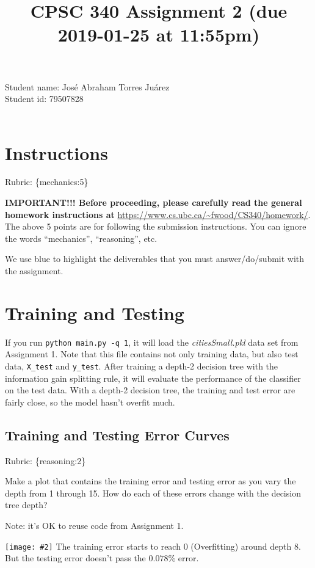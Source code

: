 \documentclass{article}
\def\rubric#1{\gre{Rubric: \{#1\}}}{}
\def\blu#1{{\color{blu}#1}}
\def\gre#1{{\color{gre}#1}}
\def\ans#1{{\color{ans}#1}}
\newcommand{\fig}[2]{\texttt{[image: \#2]}}
\begin{document}
\title{CPSC 340 Assignment 2 (due 2019-01-25 at 11:55pm)}
\author{}
\date{}
\maketitle
\vspace{-4em}
\ans{
    Student name: José Abraham Torres Juárez \\
    Student id: 79507828 \\ \\
}
\section*{Instructions}
\rubric{mechanics:5}

\textbf{IMPORTANT!!! Before proceeding, please carefully read the general homework instructions at} \url{https://www.cs.ubc.ca/~fwood/CS340/homework/}. The above 5 points are for following the submission instructions. You can ignore the words ``mechanics'', ``reasoning'', etc.

\vspace{1em}
We use \blu{blue} to highlight the deliverables that you must answer/do/submit with the assignment.

\section{Training and Testing}
If you run \texttt{python main.py \string-q 1}, it will load the \emph{citiesSmall.pkl} data set from Assignment 1.
Note that this file contains not only training data, but also test data, \texttt{X\string_test} and \texttt{y\string_test}.
After training a depth-2 decision tree with the information gain splitting rule, it will evaluate the performance of the classifier on the test data.
With a depth-2 decision tree, the training and test error are fairly close, so the model hasn't overfit much.

\subsection{Training and Testing Error Curves}
\rubric{reasoning:2}

\blu{Make a plot that contains the training error and testing error as you vary the depth from 1 through 15. How do each of these errors change with the decision tree depth?}

Note: it's OK to reuse code from Assignment 1.

\fig{1}{../figs/q1_1_errors.pdf}
\ans{
   The training error starts to reach 0 (Overfitting) around depth 8. But the testing error doesn't 
   pass the $0.078\%$ error.
}
\end{document}
